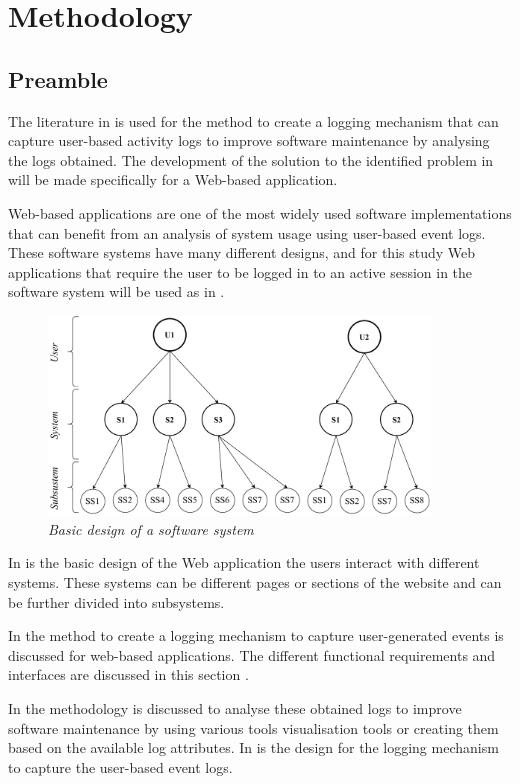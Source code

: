 \chapter{Methodology}
\label{chap:2}

\section{Preamble}\label{sec:ch2_preamble}
 The literature in  is used for the method to create a logging mechanism that can capture user-based activity logs to improve software maintenance by analysing the logs obtained. The development of the solution to the identified problem in  will be made specifically for a Web-based application.\par Web-based applications are one of the most widely used software implementations that can benefit from an analysis of system usage using user-based event logs. These software systems have many different designs, and for this study Web applications that require the user to be logged in to an active session in the software system will be used as in .

 \begin{figure}[!htb]
	\centering %
	\includegraphics[width=0.9\textwidth]{img/Chapter2/systemOverview/systemOverview.pdf}
	\caption[Basic design of a software system]
	{\textit{Basic design of a software system}}\label{fig:ch2_webSystemBasic}
\end{figure}
 
 In  is the basic design of the Web application the users interact with different systems. These systems can be different pages or sections of the website and can be further divided into subsystems. \par In  the method to create a logging mechanism to capture user-generated events is discussed for web-based applications. The different functional requirements and interfaces are discussed in this section \cite{Anish2015}.\par In  the methodology is discussed to analyse these obtained logs to improve software maintenance by using various tools visualisation tools or creating them based on the available log attributes. In  is the design for the logging mechanism to capture the user-based event logs.

